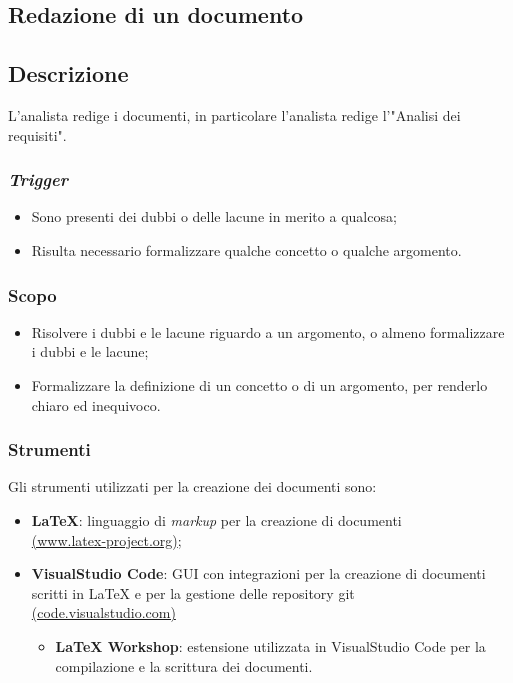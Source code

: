 \subsection{Redazione di un documento}
\label{redazione-documento}

\subsection{Descrizione}

L'analista redige i documenti, in particolare l'analista redige l'"Analisi dei
requisiti".

\subsubsection{\textit{Trigger}}
\begin{itemize}
	\item Sono presenti dei dubbi o delle lacune in merito a qualcosa;

	\item Risulta necessario formalizzare qualche concetto o qualche argomento.
\end{itemize}

\subsubsection{Scopo}
\begin{itemize}
	\item Risolvere i dubbi e le lacune riguardo a un argomento, o almeno
	      formalizzare i dubbi e le lacune;

	\item Formalizzare la definizione di un concetto o di un argomento, per
	      renderlo chiaro ed inequivoco.
\end{itemize}

\subsubsection{Strumenti}
Gli strumenti utilizzati per la creazione dei documenti sono:
\begin{itemize}
	\item \textbf{LaTeX}: linguaggio di \textit{markup} per la creazione di documenti \\
	      \href{https://www.latex-project.org/}{(www.latex-project.org)};
	\item \textbf{VisualStudio Code}: GUI con integrazioni per la creazione di documenti scritti in LaTeX e per la gestione delle repository git \\
	      \href{https://code.visualstudio.com/}{(code.visualstudio.com)}
	      \begin{itemize}
		      \item \textbf{LaTeX Workshop}: estensione utilizzata in VisualStudio Code per la compilazione e la scrittura dei documenti.
	      \end{itemize}
\end{itemize}

